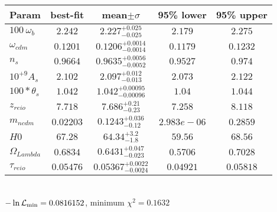 \begin{tabular}{|l|c|c|c|c|} 
 \hline 
Param & best-fit & mean$\pm\sigma$ & 95\% lower & 95\% upper \\ \hline 
$100~\omega{}_{b }$ &$2.242$ & $2.227_{-0.025}^{+0.025}$ & $2.179$ & $2.275$ \\ 
$\omega{}_{cdm }$ &$0.1201$ & $0.1206_{-0.0014}^{+0.0014}$ & $0.1179$ & $0.1232$ \\ 
$n_{s }$ &$0.9664$ & $0.9635_{-0.0052}^{+0.0056}$ & $0.9527$ & $0.974$ \\ 
$10^{+9}A_{s }$ &$2.102$ & $2.097_{-0.013}^{+0.012}$ & $2.073$ & $2.122$ \\ 
$100*\theta{}_{s }$ &$1.042$ & $1.042_{-0.00096}^{+0.00095}$ & $1.04$ & $1.044$ \\ 
$z_{reio }$ &$7.718$ & $7.686_{-0.23}^{+0.21}$ & $7.258$ & $8.118$ \\ 
$m_{ncdm }$ &$0.02203$ & $0.1243_{-0.12}^{+0.036}$ & $2.983e-06$ & $0.2859$ \\ 
$H0$ &$67.28$ & $64.34_{-1.8}^{+3.2}$ & $59.56$ & $68.56$ \\ 
$\Omega{}_{Lambda }$ &$0.6834$ & $0.6431_{-0.023}^{+0.047}$ & $0.5706$ & $0.7028$ \\ 
$\tau{}_{reio }$ &$0.05476$ & $0.05367_{-0.0024}^{+0.0022}$ & $0.04921$ & $0.05818$ \\ 
\hline 
 \end{tabular} \\ 
$-\ln{\cal L}_\mathrm{min} =0.0816152$, minimum $\chi^2=0.1632$ \\ 
